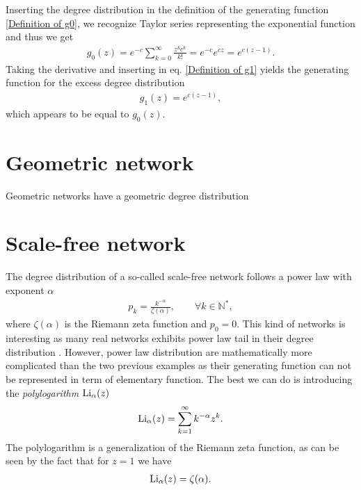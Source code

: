 \documentclass[
11pt, %
english, %
singlespacing, %
liststotoc, %
headsepline, %
]{MastersDoctoralThesis} %
\begin{document}
Inserting the degree distribution in the definition of the generating function \eqref{Definition of g0}, we recognize Taylor series representing the exponential function and thus we get
\begin{align}
	g_0(z) = e^{-c} \sum_{k = 0}^\infty \frac{z^k c^k}{k!} = e^{-c} e^{c z} = e^{c(z - 1)}. \label{g0 for ER networks}
\end{align}
Taking the derivative and inserting in eq. \eqref{Definition of g1} yields the generating function for the excess degree distribution
\begin{align} 
	g_1(z) = e^{c(z - 1)},
\end{align}
which appears to be equal to $g_0(z)$.

\section{Geometric network}

Geometric networks have a geometric degree distribution

\section{Scale-free network}

The degree distribution of a so-called scale-free network follows a power law with exponent $\alpha$
\begin{align}
	p_k = \frac{k^{-\alpha}}{\zeta(\alpha)}, \qquad \forall k \in \mathbb{N}^*, \label{Power law degree distribution}
\end{align}
where $\zeta(\alpha)$ is the Riemann zeta function and $p_0 = 0$. This kind of networks is interesting as many real networks exhibits power law tail in their degree distribution . However, power law distribution are mathematically more complicated than the two previous examples as their generating function can not be represented in term of elementary function. The best we can do is introducing the \emph{polylogarithm} $\polylog{\alpha}{z}$
\begin{align}
	\polylog{\alpha}{z} = \sum_{k=1}^\infty k^{-\alpha} z^k. \label{Definition of polylogarithm}
\end{align}
The polylogarithm is a generalization of the Riemann zeta function, as can be seen by the fact that for $z = 1$ we have
\begin{align}
	\polylog{\alpha}{1} = \zeta(\alpha) \label{Polylogarithm of 1}.
\end{align}
\end{document}
